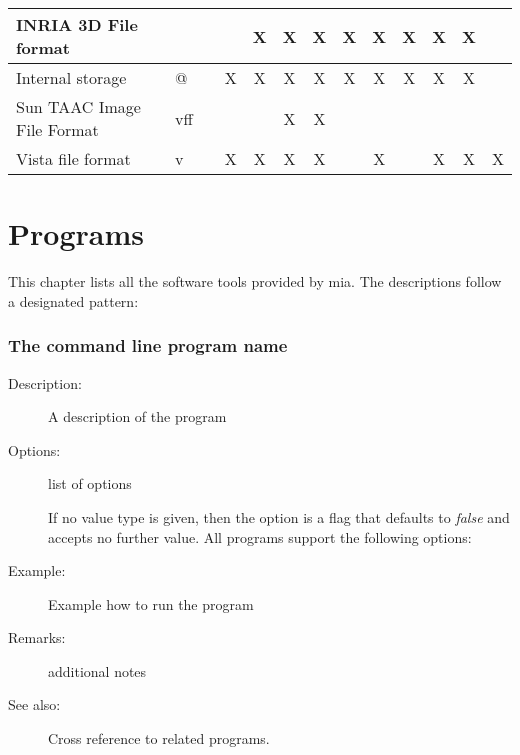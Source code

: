 \documentclass[english, 10pt, a4paper,headsepline,openany]{book}
\newcommand{\has}{\cellcolor[gray]{0.5}X}
\begin{document}
\begin{table}[h]
\begin{tabular}{lll|c|c|c|c|c|c|c|c|c|c}
\hline 
INRIA 3D File format      &     &            &   &\has &\has &\has &\has &\has &\has &\has&\has&   \\
\hline 
Internal storage          & @   &            &\has& \has&\has &\has &\has &\has &\has &\has&\has&   \\
\hline 
Sun TAAC Image File Format& vff &            &   &    &\has &\has &    &    &    &   &   &   \\
\hline 
Vista file format         & v   &            &\has&\has &\has &\has &    &\has &    &\has&\has&\has\\
\hline 
\end{tabular}
\end{table}


%

\chapter{Programs}
\label{ch:prog}


This chapter lists all the software tools provided by mia. 
The descriptions follow a designated pattern: 

\subsection*{The command line program name}
\begin{description}
\item [Description:]A description of the program
\item [Options:] list of options

\noindent 
{}

\noindent 
If no value type is given, then the option is a flag that defaults to \emph{false} and accepts no 
     further value. 
All programs support the following options: 


\item [Example:] Example how to run the program 

\item [Remarks:] additional notes
\item [See also:] Cross reference to related programs. 
\end{description}
\end{document}
